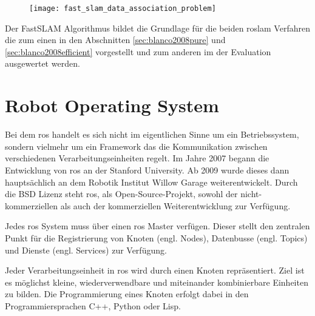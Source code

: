 \begin{figure}
	\centering
	\texttt{[image: fast\_slam\_data\_association\_problem]}
	\label{fig:fast_slam_data_association_problemn}
\end{figure}

Der FastSLAM Algorithmus bildet die Grundlage für die beiden \gls{roslam} Verfahren die zum einen in den Abschnitten \ref{sec:blanco2008pure} und \ref{sec:blanco2008efficient} vorgestellt und zum anderen im der Evaluation ausgewertet werden.


%
%


%
%
\section{Robot Operating System}

Bei dem \Gls{ros} handelt es sich nicht im eigentlichen Sinne um ein Betriebssystem, sondern vielmehr um ein Framework das die Kommunikation zwischen verschiedenen Verarbeitungseinheiten regelt. Im Jahre 2007 begann die Entwicklung von \Gls{ros} an der Stanford University. Ab 2009 wurde dieses dann hauptsächlich an dem Robotik Institut Willow Garage weiterentwickelt. Durch die BSD Lizenz steht \Gls{ros}, als Open-Source-Projekt, sowohl der nicht-kommerziellen als auch der kommerziellen Weiterentwicklung zur Verfügung. \cite{quigley2009ros}

Jedes \Gls{ros} System muss über einen \Gls{ros} Master verfügen. Dieser stellt den zentralen Punkt für die Registrierung von Knoten (engl. Nodes), Datenbusse (engl. Topics) und Dienste (engl. Services) zur Verfügung.

Jeder Verarbeitungseinheit in \Gls{ros} wird durch einen Knoten repräsentiert. Ziel ist es möglichst kleine, wiederverwendbare und miteinander kombinierbare Einheiten zu bilden. Die Programmierung eines Knoten erfolgt dabei in den Programmiersprachen C++, Python oder Lisp.

